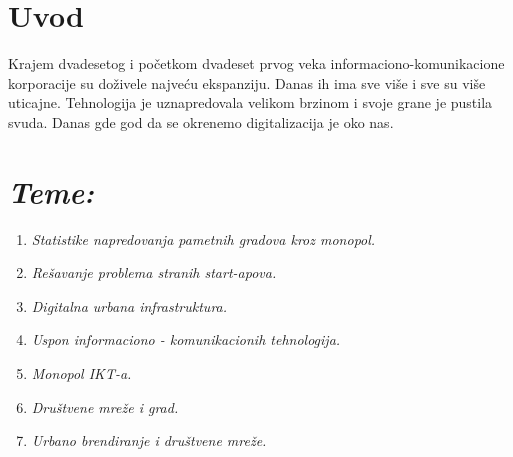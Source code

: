 \documentclass[a0,portrait]{a0poster}
\begin{document}
\vspace{3cm} %


\begin{multicols}{2} %


\color{Black} %



\color{Black} %

\section*{\Huge{Uvod}}

\Large{
Krajem dvadesetog i početkom dvadeset prvog veka informaciono-komunikacione korporacije su doživele najveću ekspanziju. Danas ih ima sve više i sve su više uticajne. Tehnologija je uznapredovala velikom brzinom i svoje grane je pustila svuda. Danas gde god da se okrenemo digitalizacija je oko nas. 
}


\color{teal} %

\section*{\huge{\textit{Teme:}}}

\begin{enumerate}
\item \textit{Statistike napredovanja pametnih gradova kroz monopol.}
\item \textit{Rešavanje problema stranih start-apova.}
\item \textit{Digitalna urbana infrastruktura.}
\item \textit{Uspon informaciono - komunikacionih tehnologija.}
\item \textit{Monopol IKT-a.}
\item \textit{Društvene mreže i grad.}
\item \textit{Urbano brendiranje i društvene mreže.}
\end{enumerate}


\end{multicols}
\end{document}

